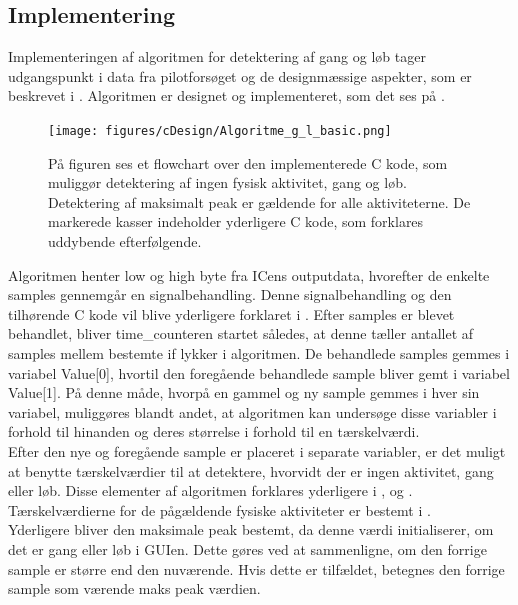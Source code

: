 \subsection{Implementering}
Implementeringen af algoritmen for detektering af gang og løb tager udgangspunkt i data fra pilotforsøget og de designmæssige aspekter, som er beskrevet i . Algoritmen er designet og implementeret, som det ses på .
\begin{figure}[H]
	\centering
	\texttt{[image: figures/cDesign/Algoritme\_g\_l\_basic.png]}
	\caption{På figuren ses et flowchart over den implementerede C kode, som muliggør detektering af ingen fysisk aktivitet, gang og løb. Detektering af maksimalt peak er gældende for alle aktiviteterne. De markerede kasser indeholder yderligere C kode, som forklares uddybende efterfølgende.}
	\label{fig:basic_algo_g_l}
\end{figure}\vspace{-0.25cm}
Algoritmen henter low og high byte fra ICens outputdata, hvorefter de enkelte samples gennemgår en signalbehandling. Denne signalbehandling og den tilhørende C kode vil blive yderligere forklaret i . Efter samples er blevet behandlet, bliver time\_counteren startet således, at denne tæller antallet af samples mellem bestemte if lykker i algoritmen. De behandlede samples gemmes i variabel Value[0], hvortil den foregående behandlede sample bliver gemt i variabel Value[1]. På denne måde, hvorpå en gammel og ny sample gemmes i hver sin variabel, muliggøres blandt andet, at algoritmen kan undersøge disse variabler i forhold til hinanden og deres størrelse i forhold til en tærskelværdi. \\
Efter den nye og foregående sample er placeret i separate variabler, er det muligt at benytte tærskelværdier til at detektere, hvorvidt der er ingen aktivitet, gang eller løb. Disse elementer af algoritmen forklares yderligere i ,  og . Tærskelværdierne for de pågældende fysiske aktiviteter er bestemt i . \\ 
Yderligere bliver den maksimale peak bestemt, da denne værdi initialiserer, om det er gang eller løb i GUIen. Dette gøres ved at sammenligne, om den forrige sample er større end den nuværende. Hvis dette er tilfældet, betegnes den forrige sample som værende maks peak værdien. %

